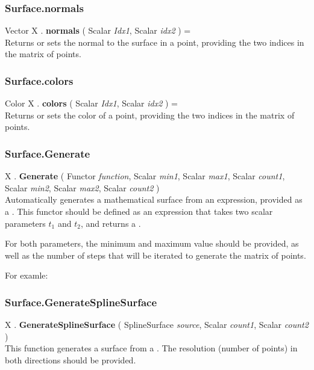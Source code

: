 \subsubsection{Surface.normals \label{F:Surface:normals}}
Vector X . \textbf{normals} ( Scalar \textit{Idx1}, Scalar \textit{idx2} ) = \\
Returns or sets the normal to the surface in a point, providing the two indices in the matrix of points.

\subsubsection{Surface.colors \label{F:Surface:colors}}
Color X . \textbf{colors} ( Scalar \textit{Idx1}, Scalar \textit{idx2} ) = \\
Returns or sets the color of a point, providing the two indices in the matrix of points.

\subsubsection{Surface.Generate \label{F:Surface:Generate}}
X . \textbf{Generate} ( Functor \textit{function}, Scalar \textit{min1}, Scalar \textit{max1}, Scalar \textit{count1}, Scalar \textit{min2}, Scalar \textit{max2}, Scalar \textit{count2} ) \\
Automatically generates a mathematical surface from an expression, provided as a . This functor should be defined as an expression that takes two scalar parameters $t_1$ and $t_2$, and returns a .

For both parameters, the minimum and maximum value should be provided, as well as the number of steps that will be iterated to generate the matrix of points.

For examle: \\

\subsubsection{Surface.GenerateSplineSurface \label{F:Surface:GenerateSplineSurface}}
X . \textbf{GenerateSplineSurface} ( SplineSurface \textit{source}, Scalar \textit{count1}, Scalar \textit{count2} ) \\
This function generates a surface from a . The resolution (number of points) in both directions should be provided.

